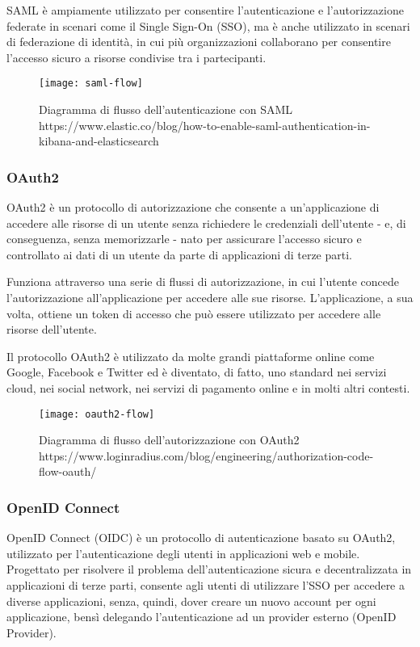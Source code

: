 SAML è ampiamente utilizzato per consentire l'autenticazione e l'autorizzazione federate in scenari come il Single Sign-On (SSO), ma è anche utilizzato in scenari di federazione di identità, in cui più organizzazioni collaborano per consentire l'accesso sicuro a risorse condivise tra i partecipanti.

\begin{figure}[!h] 
    \centering 
    \texttt{[image: saml-flow]} 
    \caption{Diagramma di flusso dell'autenticazione con SAML
    https://www.elastic.co/blog/how-to-enable-saml-authentication-in-kibana-and-elasticsearch}
\end{figure}

\subsubsection{OAuth2}
OAuth2 è un protocollo di autorizzazione che consente a un'applicazione di accedere alle risorse di un utente senza richiedere le credenziali dell'utente - e, di conseguenza, senza memorizzarle - nato per assicurare l'accesso sicuro e controllato ai dati di un utente da parte di applicazioni di terze parti.

Funziona attraverso una serie di flussi di autorizzazione, in cui l'utente concede l'autorizzazione all'applicazione per accedere alle sue risorse. L'applicazione, a sua volta, ottiene un token di accesso che può essere utilizzato per accedere alle risorse dell'utente.

Il protocollo OAuth2 è utilizzato da molte grandi piattaforme online come Google, Facebook e Twitter ed è diventato, di fatto, uno standard nei servizi cloud, nei social network, nei servizi di pagamento online e in molti altri contesti.

\begin{figure}[!h] 
    \centering 
    \texttt{[image: oauth2-flow]} 
    \caption{Diagramma di flusso dell'autorizzazione con OAuth2
    https://www.loginradius.com/blog/engineering/authorization-code-flow-oauth/}
\end{figure}
\subsubsection{OpenID Connect}
OpenID Connect (OIDC) è un protocollo di autenticazione basato su OAuth2, utilizzato per l'autenticazione degli utenti in applicazioni web e mobile. Progettato per risolvere il problema dell'autenticazione sicura e decentralizzata in applicazioni di terze parti, consente agli utenti di utilizzare l'SSO per accedere a diverse applicazioni, senza, quindi, dover creare un nuovo account per ogni applicazione, bensì delegando l'autenticazione ad un provider esterno (OpenID Provider).

